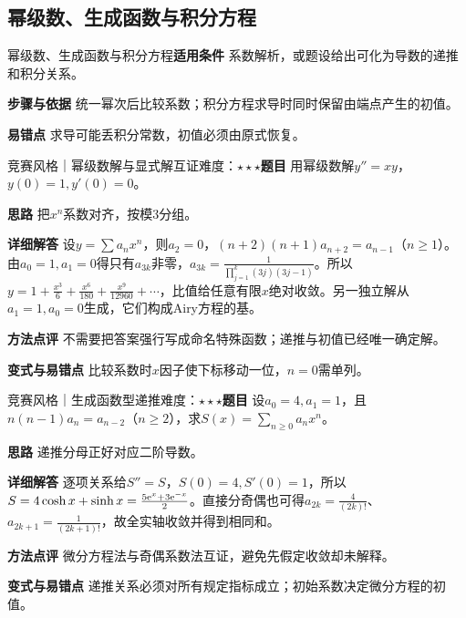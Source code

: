 \subsection{幂级数、生成函数与积分方程}\label{deep:ode_source_deep:series}

\begin{method}{幂级数、生成函数与积分方程}\textbf{适用条件} 系数解析，或题设给出可化为导数的递推和积分关系。\par\textbf{步骤与依据} 统一幂次后比较系数；积分方程求导时同时保留由端点产生的初值。\par\textbf{易错点} 求导可能丢积分常数，初值必须由原式恢复。\end{method}

\begin{example}{竞赛风格｜幂级数解与显式解互证}{难度：$\star\star\star$}\label{deep:ex:ode_source_deep:power}\textbf{题目} 用幂级数解$y''=xy$，$y(0)=1,y'(0)=0$。\par\textbf{思路} 把$x^n$系数对齐，按模3分组。\par\textbf{详细解答} 设$y=\sum a_nx^n$，则$a_2=0$，$(n+2)(n+1)a_{n+2}=a_{n-1}$（$n\ge1$）。由$a_0=1,a_1=0$得只有$a_{3k}$非零，$a_{3k}=\frac{1}{\prod_{j=1}^k(3j)(3j-1)}$。所以$y=1+\frac{x^3}{6}+\frac{x^6}{180}+\frac{x^9}{12960}+\cdots$，比值给任意有限$x$绝对收敛。另一独立解从$a_1=1,a_0=0$生成，它们构成Airy方程的基。\par\textbf{方法点评} 不需要把答案强行写成命名特殊函数；递推与初值已经唯一确定解。\par\textbf{变式与易错点} 比较系数时$x$因子使下标移动一位，$n=0$需单列。\end{example}

\begin{example}{竞赛风格｜生成函数型递推}{难度：$\star\star\star$}\label{deep:ex:ode_source_deep:generating}\textbf{题目} 设$a_0=4,a_1=1$，且$n(n-1)a_n=a_{n-2}$（$n\ge2$），求$S(x)=\sum_{n\ge0}a_nx^n$。\par\textbf{思路} 递推分母正好对应二阶导数。\par\textbf{详细解答} 逐项关系给$S''=S$，$S(0)=4,S'(0)=1$，所以$S=4\cosh x+\sinh x=\frac{5\mathrm{e}^x+3\mathrm{e}^{-x}}{2}$。直接分奇偶也可得$a_{2k}=\frac{4}{(2k)!}$、$a_{2k+1}=\frac{1}{(2k+1)!}$，故全实轴收敛并得到相同和。\par\textbf{方法点评} 微分方程法与奇偶系数法互证，避免先假定收敛却未解释。\par\textbf{变式与易错点} 递推关系必须对所有规定指标成立；初始系数决定微分方程的初值。\end{example}

